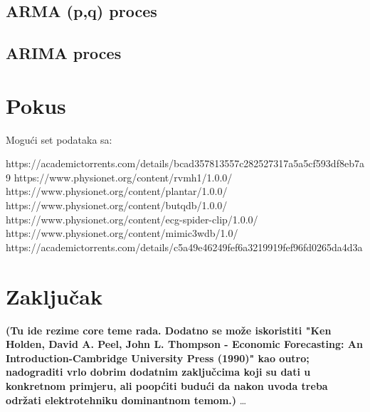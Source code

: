 \documentclass[a4paper,12pt,oneside]{memoir}
\begin{document}
        \section{ARMA (p,q) proces}
        \section{ARIMA proces}
    \chapter{Pokus}
        Mogući set podataka sa:

        https://academictorrents.com/details/bcad357813557c282527317a5a5cf593df8eb7a9
        https://www.physionet.org/content/rvmh1/1.0.0/
        https://www.physionet.org/content/plantar/1.0.0/
        https://www.physionet.org/content/butqdb/1.0.0/
        https://www.physionet.org/content/ecg-spider-clip/1.0.0/
        https://www.physionet.org/content/mimic3wdb/1.0/
        https://academictorrents.com/details/c5a49e46249fef6a3219919fef96fd0265da4d3a


    \chapter{Zaključak}
        \textbf{(Tu ide rezime core teme rada. Dodatno se može iskoristiti "Ken Holden, David A. Peel, John L. Thompson - Economic Forecasting: An Introduction-Cambridge University Press (1990)" kao outro; nadograditi vrlo dobrim dodatnim zaključcima koji su dati u konkretnom primjeru, ali poopćiti budući da nakon uvoda treba održati elektrotehniku dominantnom temom.)} %
        \ldots{}
\end{document}
